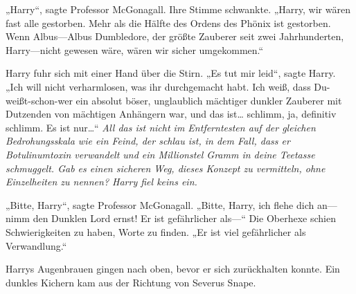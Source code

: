 „Harry“, sagte Professor McGonagall. Ihre Stimme schwankte. „Harry, wir wären fast alle gestorben. Mehr als die Hälfte des Ordens des Phönix ist gestorben. Wenn Albus—Albus Dumbledore, der größte Zauberer seit zwei Jahrhunderten, Harry—nicht gewesen wäre, wären wir sicher umgekommen.“

Harry fuhr sich mit einer Hand über die Stirn. „Es tut mir leid“, sagte Harry. „Ich will nicht verharmlosen, was ihr durchgemacht habt. Ich weiß, dass Du-weißt-schon-wer ein absolut böser, unglaublich mächtiger dunkler Zauberer mit Dutzenden von mächtigen Anhängern war, und das ist… schlimm, ja, definitiv schlimm. Es ist nur…“ \emph{All das ist nicht im Entferntesten auf der gleichen Bedrohungsskala wie ein Feind, der schlau ist, in dem Fall, dass er Botulinumtoxin verwandelt und ein Millionstel Gramm in deine Teetasse schmuggelt. Gab es einen sicheren Weg, dieses Konzept zu vermitteln, ohne Einzelheiten zu nennen? Harry fiel keins ein.}

„Bitte, Harry“, sagte Professor McGonagall. „Bitte, Harry, ich flehe dich an—nimm den Dunklen Lord ernst! Er ist gefährlicher als—“ Die Oberhexe schien Schwierigkeiten zu haben, Worte zu finden. „Er ist viel gefährlicher als Verwandlung.“

Harrys Augenbrauen gingen nach oben, bevor er sich zurückhalten konnte. Ein dunkles Kichern kam aus der Richtung von Severus Snape.

